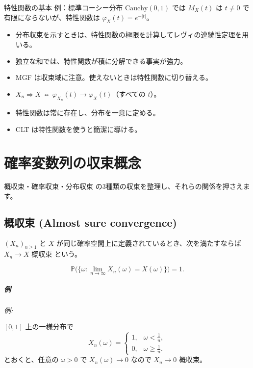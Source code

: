 \documentclass[uplatex,dvipdfmx,11pt,a4paper,openany]{bxjsbook}
\newcommand{\columnheading}[1]{\par\medskip{\large\color{ColumnInk}#1}\par\smallskip}
\begin{document}
\begin{columnbox}{特性関数の基本}
例：標準コーシー分布 $\mathrm{Cauchy}(0,1)$ では $M_X(t)$ は $t\ne0$ で有限にならないが、特性関数は $\varphi_X(t)=e^{-|t|}$。

\columnheading{実用メモ}
\begin{itemize}
\item 分布収束を示すときは、特性関数の極限を計算してレヴィの連続性定理を用いる。
\item 独立な和では、特性関数が積に分解できる事実が強力。
\item MGF は収束域に注意。使えないときは特性関数に切り替える。
\end{itemize}

\columnheading{まとめ}
\begin{itemize}
\item $X_n\Rightarrow X$ ⇔ $\varphi_{X_n}(t)\to\varphi_X(t)$（すべての $t$）。
\item 特性関数は常に存在し、分布を一意に定める。
\item CLT は特性関数を使うと簡潔に導ける。
\end{itemize}

\end{columnbox}

\chapter{確率変数列の収束概念}
概収束・確率収束・分布収束 の3種類の収束を整理し、それらの関係を押さえます。

\section{概収束 (Almost sure convergence)}
$(X_n)_{n\ge 1}$ と $X$ が同じ確率空間上に定義されているとき、次を満たすならば $X_n \to X$ 概収束 という。

\[\mathbb P\Big(\big\{\omega : \lim_{n\to\infty} X_n(\omega) = X(\omega)\big\}\Big) = 1.\]

\paragraph{例}
\emph{例:}

$[0,1]$ 上の一様分布で \[X_n(\omega) = \begin{cases} 1, & \omega < \tfrac{1}{n}, \\ 0, & \omega \ge \tfrac{1}{n}. \end{cases}\] とおくと、任意の $\omega > 0$ で $X_n(\omega) \to 0$ なので $X_n \to 0$ 概収束。
\end{document}
